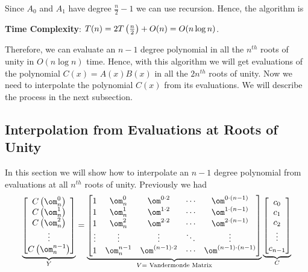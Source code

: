 \vspace*{5mm}\parinf
Since $A_0$ and $A_1$ have degree $\frac{n}2-1$ we can use recursion. Hence, the algorithm is
\begin{algorithm}
	\DontPrintSemicolon
	\caption{$(A)$}
\end{algorithm}

\textbf{Time Complexity}: $T(n)=2T\left(\frac{n}2\right)+O(n)=O(n\log n)$.\parinn

Therefore, we can evaluate an $n-1$ degree polynomial in all the $n^{th}$ roots of unity in $O(n\log n)$ time. Hence, with this algorithm we will get evaluations of the polynomial $C(x)=A(x)B(x)$ in all the $2n^{th}$ roots of unity. Now we need to interpolate the polynomial $C(x)$ from its evaluations. We will describe the process in the next subsection.
\subsection{Interpolation from Evaluations at Roots of Unity}
In this section we will show how to interpolate an $n-1$ degree polynomial from evaluations at all $n^{th}$ roots of unity. Previously we had $$\underbrace{\mat{C\lt(\om^0_n\rt)\\ C\lt(\om^1_n\rt)\\ C\lt(\om^2_n\rt)\\ \vdots\\ C\lt(\om^{n-1}_n\rt)}}_{Y}=\underbrace{\mat{1 & \om^0_n & \om ^{0\cdot 2}& \cdots & \om^{0\cdot (n-1)}\\  1 & \om^1_n & \om ^{1\cdot 2}& \cdots & \om^{1\cdot (n-1)}\\ 1 & \om^2_n & \om ^{2\cdot 2}& \cdots & \om^{2\cdot (n-1)}\\ \vdots & \vdots & \vdots & \ddots & \vdots\\ 1 & \om^{n-1}_n & \om ^{(n-1)\cdot 2}& \cdots & \om^{(n-1)\cdot (n-1)}}}_{V=\text{ Vandermonde Matrix}}\underbrace{\mat{c_0\\ c_1\\ c_2\\ \vdots \\ c_{n-1}}}_{C}$$

